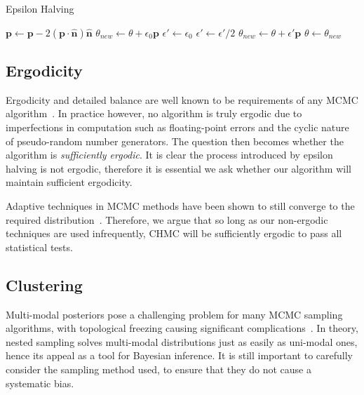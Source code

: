 \documentclass[11pt]{article}
\begin{document}
    \begin{algorithm}
        \caption{Epsilon Halving}
        \label{alg:epsilon_halving}
        \begin{algorithmic}
            \STATE {}
            \STATE $\mathbf{p} \gets \mathbf{p} - 2 \left(\mathbf{p} \cdot \hat{ \mathbf{n} } \right) \hat{ \mathbf{n} }$
            \STATE
            \STATE $ \theta_{new} \gets \theta + \epsilon_0 \mathbf{p}$
            \STATE $ \epsilon' \gets \epsilon_0$
            \STATE
                \STATE $\epsilon' \gets \epsilon' / 2$
                \STATE $ \theta_{new} \gets \theta + \epsilon' \mathbf{p}$
            \ENDWHILE
            \STATE
            \STATE $\theta \gets \theta_{new}$
        \end{algorithmic}
    \end{algorithm}


\subsection{Ergodicity}\label{subsec:ergodicity}
    Ergodicity and detailed balance are well known to be requirements of any MCMC algorithm~\cite{Metropolis_OG}.
    In practice however, no algorithm is truly ergodic due to imperfections in computation such as floating-point
    errors and the cyclic nature of pseudo-random number generators.
    The question then becomes whether the algorithm is \emph{sufficiently ergodic}.
    It is clear the process introduced by epsilon halving is not ergodic, therefore it is essential we ask
    whether our algorithm will maintain sufficient ergodicity.

    Adaptive techniques in MCMC methods have been shown to still converge to the required
    distribution~\cite{MCMC_Ergodicity}.
    Therefore, we argue that so long as our non-ergodic techniques are used infrequently, CHMC will be sufficiently
    ergodic to pass all statistical tests.

\subsection{Clustering}\label{subsec:clustering}

    Multi-modal posteriors pose a challenging problem for many MCMC sampling algorithms, with topological freezing
    causing significant complications~\cite{mangoubi2018_HMC_Multimodal}.
    In theory, nested sampling solves multi-modal distributions just as easily as uni-modal ones, hence
    its appeal as a tool for Bayesian inference.
    It is still important to carefully consider the sampling method used, to ensure that they do not
    cause a systematic bias.
\end{document}

